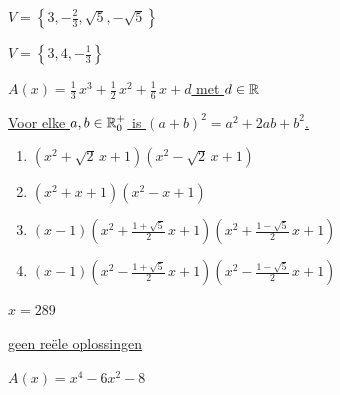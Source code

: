 \documentclass{ximera}
\begin{document}
\pagebreak

\begin{oplossing} 
\hyperlink{oef4.7}{$V = \left\{ 3, -\frac{2}{3}, \sqrt{5}, -\sqrt{5} \right\}$}
\end{oplossing} 

\begin{oplossing} 
\hyperlink{oef4.8}{$V = \left\{ 3, 4, -\frac{1}{3}\right\}$}
\end{oplossing} 

\begin{oplossing} 
\hyperlink{oef4.9}{$A(x) = \frac{1}{3}\,x^3 + \frac{1}{2}\,x^2 + \frac{1}{6}\,x + d$ met $d \in \mathbb{R}$}
\end{oplossing} 

\begin{oplossing} 
\hyperlink{oef4.10}{Voor elke $a,b \in \mathbb{R}^+_0$ is $(a+b)^2 = a^2 + 2ab + b^2$.}
\end{oplossing} 

\begin{oplossing} 
\begin{enumerate}
\item
\hyperlink{oef4.11}{$(x^2+\sqrt{2}\,x+1)(x^2-\sqrt{2}\,x+1)$}
\item
\hyperlink{oef4.11}{$(x^2+x+1)(x^2-x+1)$}
\item
\hyperlink{oef4.11}{$(x-1)\left(x^2+\frac{1+\sqrt{5}}{2}\,x+1\right)\left(x^2+\frac{1-\sqrt{5}}{2}\,x+1\right)$}
\item
\hyperlink{oef4.11}{$(x-1)\left(x^2-\frac{1+\sqrt{5}}{2}\,x+1\right)\left(x^2-\frac{1-\sqrt{5}}{2}\,x+1\right)$}
\end{enumerate}
\setcounter{enumi}{16}
\end{oplossing} 

\begin{oplossing} 
\hyperlink{oef4.17}{$x=289$}
\end{oplossing} 

\begin{oplossing} 
\hyperlink{oef4.18}{geen re\"ele oplossingen}
\end{oplossing} 

\begin{oplossing} 
\hyperlink{oef4.19}{$A(x)=x^4-6x^2-8$}
\end{oplossing} 

\end{document}
